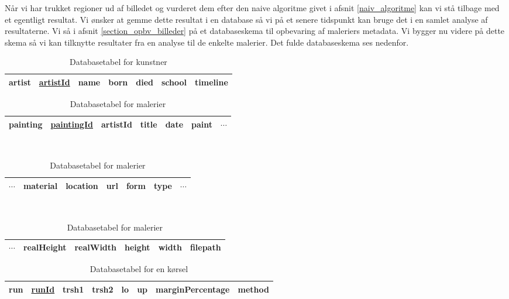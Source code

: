 {
Når vi har trukket regioner ud af billedet og vurderet dem efter den
naive algoritme givet i afsnit \ref{naiv_algoritme} kan vi stå tilbage
med et egentligt resultat. Vi ønsker at gemme dette resultat i en
database så vi på et senere tidspunkt kan bruge det i en samlet analyse
af resultaterne.  Vi så i afsnit \ref{section_opbv_billeder} på et
databaseskema til opbevaring af maleriers metadata. Vi bygger nu videre
på dette skema så vi kan tilknytte resultater fra en analyse til de
enkelte malerier. Det fulde databaseskema ses nedenfor.

\begin{table}[!h]
    \centering
    \begin{tabular}{|l||c|c|c|c|c|c|}
        \hline
        \bf{artist} \hspace{0.5cm} & \underline{artistId} & name & born & died & school & timeline \\\hline
    \end{tabular}
    \caption{Databasetabel for kunstner}
    \label{artistTable}
\end{table}

\begin{table}[!h]
    \centering
    \begin{tabular}{|l||c|c|c|c|c|c}
        \hline
        \bf{painting} \hspace{0.5cm} & \underline{paintingId} & artistId & title & date & paint & $\cdots$ \\\hline
    \end{tabular}\\ \vspace{0.2cm}\hspace{1.2cm}
    \begin{tabular}{c|c|c|c|c|c|c}
        \hline
        $\cdots$ & material & location & url & form & type & $\cdots$ \\\hline
    \end{tabular}\\ \vspace{0.2cm}\hspace{1.4cm}
    \begin{tabular}{c|c|c|c|c|c|}
        \hline
        $\cdots$ & realHeight & realWidth & height & width & filepath \\\hline
    \end{tabular}
    \caption{Databasetabel for malerier}
    \label{paintingTable}
\end{table}

\begin{table}[!h]
    \centering
    \begin{tabular}{|l||c|c|c|c|c|c|c|}
        \hline
        \bf{run} \hspace{0.5cm} & \underline{runId} & trsh1 & trsh2 & lo & up & marginPercentage & method \\\hline
    \end{tabular}
    \caption{Databasetabel for en kørsel}
    \label{runTable}
\end{table}

}
